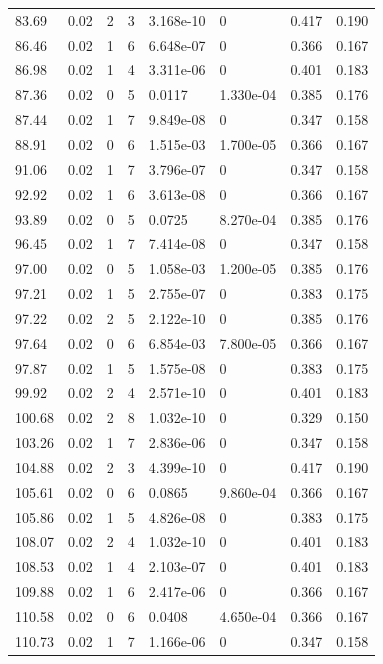 \documentclass[preview]{standalone}
\begin{document}
{{{\begin{tabular}{L{1.2cm}C{1.2cm} C{0.3cm}C{0.5cm} C{1.4cm}C{1.4cm} C{1.4cm}C{1.4cm}}
  83.69  &  0.02  & 2     &  3 &  3.168e-10  & 0  & 0.417 &  0.190   \\ 
  86.46  &  0.02  & 1     &  6 &  6.648e-07  & 0  & 0.366 &  0.167   \\ 
  86.98  &  0.02  & 1     &  4 &  3.311e-06  & 0  & 0.401 &  0.183   \\ 
  87.36  &  0.02  & 0     &  5 &  0.0117  & 1.330e-04  & 0.385 &  0.176   \\ 
  87.44  &  0.02  & 1     &  7 &  9.849e-08  & 0  & 0.347 &  0.158   \\ 
  88.91  &  0.02  & 0     &  6 &  1.515e-03  & 1.700e-05  & 0.366 &  0.167   \\ 
  91.06  &  0.02  & 1     &  7 &  3.796e-07  & 0  & 0.347 &  0.158   \\ 
  92.92  &  0.02  & 1     &  6 &  3.613e-08  & 0  & 0.366 &  0.167   \\ 
  93.89  &  0.02  & 0     &  5 &  0.0725  & 8.270e-04  & 0.385 &  0.176   \\ 
  96.45  &  0.02  & 1     &  7 &  7.414e-08  & 0  & 0.347 &  0.158   \\ 
  97.00  &  0.02  & 0     &  5 &  1.058e-03  & 1.200e-05  & 0.385 &  0.176   \\ 
  97.21  &  0.02  & 1     &  5 &  2.755e-07  & 0  & 0.383 &  0.175   \\ 
  97.22  &  0.02  & 2     &  5 &  2.122e-10  & 0  & 0.385 &  0.176   \\ 
  97.64  &  0.02  & 0     &  6 &  6.854e-03  & 7.800e-05  & 0.366 &  0.167   \\ 
  97.87  &  0.02  & 1     &  5 &  1.575e-08  & 0  & 0.383 &  0.175   \\ 
  99.92  &  0.02  & 2     &  4 &  2.571e-10  & 0  & 0.401 &  0.183   \\ 
  100.68  &  0.02  & 2     &  8 &  1.032e-10  & 0  & 0.329 &  0.150   \\ 
  103.26  &  0.02  & 1     &  7 &  2.836e-06  & 0  & 0.347 &  0.158   \\ 
  104.88  &  0.02  & 2     &  3 &  4.399e-10  & 0  & 0.417 &  0.190   \\ 
  105.61  &  0.02  & 0     &  6 &  0.0865  & 9.860e-04  & 0.366 &  0.167   \\ 
  105.86  &  0.02  & 1     &  5 &  4.826e-08  & 0  & 0.383 &  0.175   \\ 
  108.07  &  0.02  & 2     &  4 &  1.032e-10  & 0  & 0.401 &  0.183   \\ 
  108.53  &  0.02  & 1     &  4 &  2.103e-07  & 0  & 0.401 &  0.183   \\ 
  109.88  &  0.02  & 1     &  6 &  2.417e-06  & 0  & 0.366 &  0.167   \\ 
  110.58  &  0.02  & 0     &  6 &  0.0408  & 4.650e-04  & 0.366 &  0.167   \\ 
  110.73  &  0.02  & 1     &  7 &  1.166e-06  & 0  & 0.347 &  0.158   \\ 
\hline 
\end{tabular} 

}}}
\end{document}

